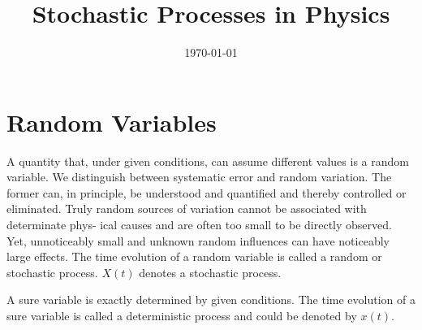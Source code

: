 \documentclass[12pt,a4paper]{article}
\title{Stochastic Processes in Physics}
\author{}
\date{\today}
\begin{document}
\maketitle

\section{Random Variables}
A quantity that, under given conditions, can assume different values is a random variable. We distinguish between systematic error and random variation. The former can, in principle, be understood and quantified and thereby controlled or eliminated. Truly random sources of variation cannot be associated with determinate phys- ical causes and are often too small to be directly observed. Yet, unnoticeably small and unknown random influences can have noticeably large effects. The time evolution of a random variable is called a random or stochastic process. $X(t)$ denotes a stochastic process.

A sure variable is exactly determined by given conditions. The time evolution of a sure variable is called a deterministic process and could be denoted by $x(t)$. 
\end{document}
